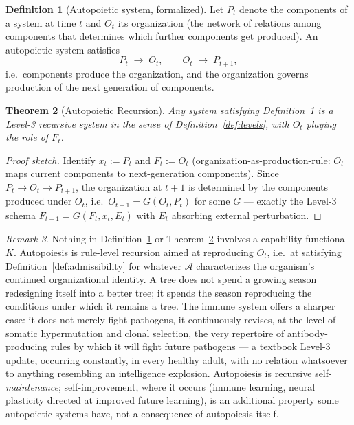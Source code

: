 \documentclass[12pt,a4paper]{article}
\theoremstyle{plain}
\newtheorem{theorem}{Theorem}[section]
\theoremstyle{definition}
\newtheorem{definition}[theorem]{Definition}
\theoremstyle{remark}
\newtheorem{remark}[theorem]{Remark}
\newcommand{\Adm}{\mathcal{A}}
\begin{document}
\begin{definition}[Autopoietic system, formalized]
\label{def:autopoiesis}
Let $P_t$ denote the components of a system at time $t$ and $O_t$ its organization (the network of relations among components that determines which further components get produced). An autopoietic system satisfies
\[
P_t \;\longrightarrow\; O_t, \qquad O_t \;\longrightarrow\; P_{t+1},
\]
i.e.\ components produce the organization, and the organization governs production of the next generation of components.
\end{definition}

\begin{theorem}[Autopoietic Recursion]
\label{thm:autopoietic-recursion}
Any system satisfying Definition~\ref{def:autopoiesis} is a Level-3 recursive system in the sense of Definition~\ref{def:levels}, with $O_t$ playing the role of $F_t$.
\end{theorem}

\begin{proof}[Proof sketch]
Identify $x_t := P_t$ and $F_t := O_t$ (organization-as-production-rule: $O_t$ maps current components to next-generation components). Since $P_t \to O_t \to P_{t+1}$, the organization at $t+1$ is determined by the components produced under $O_t$, i.e.\ $O_{t+1} = G(O_t, P_t)$ for some $G$ — exactly the Level-3 schema $F_{t+1}=G(F_t,x_t,E_t)$ with $E_t$ absorbing external perturbation.
\end{proof}

\begin{remark}
Nothing in Definition~\ref{def:autopoiesis} or Theorem~\ref{thm:autopoietic-recursion} involves a capability functional $K$. Autopoiesis is rule-level recursion aimed at reproducing $O_t$, i.e.\ at satisfying Definition~\ref{def:admissibility} for whatever $\Adm$ characterizes the organism's continued organizational identity. A tree does not spend a growing season redesigning itself into a better tree; it spends the season reproducing the conditions under which it remains a tree. The immune system offers a sharper case: it does not merely fight pathogens, it continuously revises, at the level of somatic hypermutation and clonal selection, the very repertoire of antibody-producing rules by which it will fight future pathogens — a textbook Level-3 update, occurring constantly, in every healthy adult, with no relation whatsoever to anything resembling an intelligence explosion. Autopoiesis is recursive self-\emph{maintenance}; self-improvement, where it occurs (immune learning, neural plasticity directed at improved future learning), is an additional property some autopoietic systems have, not a consequence of autopoiesis itself.
\end{remark}
\end{document}
